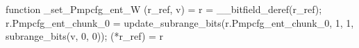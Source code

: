 function _set_Pmpcfg_ent_W (r_ref, v) = {
    r = __bitfield_deref(r_ref);
    r.Pmpcfg_ent_chunk_0 = update_subrange_bits(r.Pmpcfg_ent_chunk_0, 1, 1, subrange_bits(v, 0, 0));
    (*r_ref) = r
}

